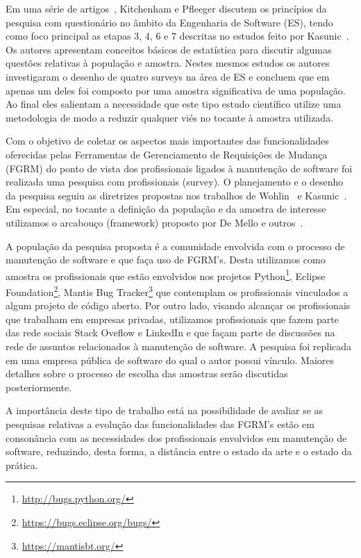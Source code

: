 Em uma série de artigos~\cite{pfleeger2001principles,pfleeger2002principles},
Kitchenham e Pfleeger discutem os princípios da pesquisa com questionário no
âmbito da Engenharia de Software (ES), tendo como foco principal as etapas 3, 4,
6 e 7 descritas no estudos feito por Kasunic~\cite{kasunic2005designing}. Os
autores apresentam conceitos básicos de estatística para discutir algumas
questões relativas à população e amostra. Nestes mesmos estudos os autores
investigaram o desenho de quatro surveys na área de ES e concluem que em
apenas um deles foi composto por uma amostra significativa de uma população. Ao
final eles salientam a necessidade que este tipo estudo científico utilize uma
metodologia de modo a reduzir qualquer viés no tocante à amostra utilizada.

Com o objetivo de coletar os aspectos mais importantes das funcionalidades
oferecidas pelas Ferramentas de Gerenciamento de Requisições de Mudança (FGRM)
do ponto de vista dos profissionais ligados à manutenção de software foi
realizada uma pesquisa com profissionais (survey). O planejamento e o desenho da
pesquisa seguiu as diretrizes propostas nos trabalhos de
Wohlin~\cite{wohlin2012experimentation} e Kasunic~\cite{kasunic2005designing}.
Em especial, no tocante a definição da população e da amostra de interesse
utilizamos o arcabouço (framework) proposto por De Mello e
outros~\cite{de2015investigating, de2014towards}.

A população da pesquisa proposta é a comunidade envolvida com o processo de
manutenção de software e que faça uso de FGRM's. Desta utilizamos  como amostra
os profissionais que estão envolvidos nos projetos
Python\footnote{\url{http://bugs.python.org/}}, Eclipse
Foundation\footnote{\url{https://bugs.eclipse.org/bugs/}}, Mantis Bug
Tracker\footnote{\url{https://mantisbt.org/}} que contemplam os profissionais
vinculados a algum projeto de código aberto. Por outro lado, visando alcançar os
profissionais que trabalham em empresas privadas, utilizamos profissionais que
fazem parte das rede sociais Stack Oveflow e LinkedIn e que façam parte de
discussões na rede de assuntos relacionados à manutenção de software. A pesquisa
foi replicada em uma empresa pública de software do qual o autor possui vínculo.
Maiores detalhes sobre o processo de escolha das amostras serão discutidas
posteriormente.

A importância deste tipo de trabalho está na possibilidade de avaliar se as
pesquisas relativas a evolução das funcionalidades das FGRM's estão em
consonância com as necessidades dos profissionais envolvidos em manutenção de
software, reduzindo, desta forma, a distância entre o estado da arte e o estado
da prática.


